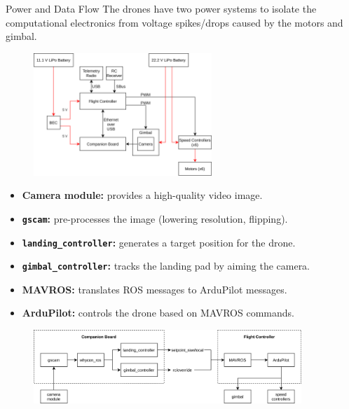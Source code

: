 \documentclass[final, 20pt]{beamer}
\newlength{\colwidth}
\begin{document}
\begin{frame}[t]
\begin{columns}[t]
\begin{column}{\colwidth}
  \begin{block}{Power and Data Flow}
        The drones have two power systems to isolate the computational electronics from voltage spikes/drops caused by the motors and gimbal.
        \begin{figure}
          \includegraphics[width=0.6\textwidth]{hardware.png}
        \end{figure}

        \vspace{-1.5cm}
        \begin{itemize}
          \item \textbf{Camera module:} provides a high-quality video image.
          \item \textbf{\texttt{gscam}:} pre-processes the image (lowering resolution, flipping).
          \item \textbf{\texttt{landing\_controller}:} generates a target position for the drone.
          \item \textbf{\texttt{gimbal\_controller}:} tracks the landing pad by aiming the camera.
          \item \textbf{MAVROS:} translates ROS messages to ArduPilot messages.
          \item \textbf{ArduPilot:} controls the drone based on MAVROS commands.
        \end{itemize}

        \begin{figure}
            \includegraphics[width=0.9\textwidth]{data_flow.png}
        \end{figure}
  \end{block}


\end{column}
\end{columns}
\end{frame}
\end{document}
